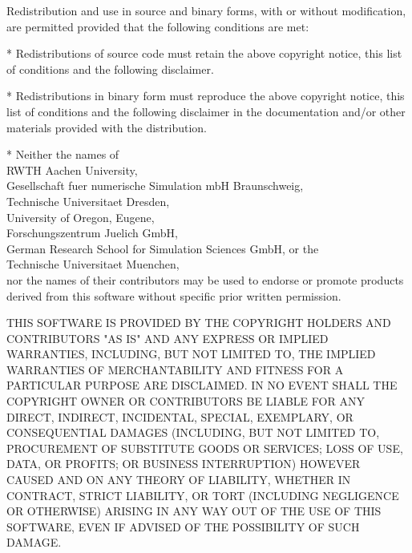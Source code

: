 {\small
Redistribution and use in source and binary forms, with or without
modification, are permitted provided that the following conditions are
met:

* Redistributions of source code must retain the above copyright
  notice, this list of conditions and the following disclaimer.

* Redistributions in binary form must reproduce the above copyright
  notice, this list of conditions and the following disclaimer in the
  documentation and/or other materials provided with the distribution.

* Neither the names of \\ \hspace*{10mm}
   RWTH Aachen University, \\ \hspace*{10mm}
   Gesellschaft fuer numerische Simulation mbH Braunschweig, \\ \hspace*{10mm}
   Technische Universitaet Dresden, \\ \hspace*{10mm}
   University of Oregon, Eugene, \\ \hspace*{10mm}
   Forschungszentrum Juelich GmbH, \\ \hspace*{10mm}
   German Research School for Simulation Sciences GmbH, or the \\ \hspace*{10mm}
   Technische Universitaet Muenchen, \\ \hspace*{10mm}
  nor the names of their contributors may be used to endorse or promote
  products derived from this software without specific prior written
  permission.

THIS SOFTWARE IS PROVIDED BY THE COPYRIGHT HOLDERS AND CONTRIBUTORS
"AS IS" AND ANY EXPRESS OR IMPLIED WARRANTIES, INCLUDING, BUT NOT
LIMITED TO, THE IMPLIED WARRANTIES OF MERCHANTABILITY AND FITNESS FOR
A PARTICULAR PURPOSE ARE DISCLAIMED. IN NO EVENT SHALL THE COPYRIGHT
OWNER OR CONTRIBUTORS BE LIABLE FOR ANY DIRECT, INDIRECT, INCIDENTAL,
SPECIAL, EXEMPLARY, OR CONSEQUENTIAL DAMAGES (INCLUDING, BUT NOT
LIMITED TO, PROCUREMENT OF SUBSTITUTE GOODS OR SERVICES; LOSS OF USE,
DATA, OR PROFITS; OR BUSINESS INTERRUPTION) HOWEVER CAUSED AND ON ANY
THEORY OF LIABILITY, WHETHER IN CONTRACT, STRICT LIABILITY, OR TORT
(INCLUDING NEGLIGENCE OR OTHERWISE) ARISING IN ANY WAY OUT OF THE USE
OF THIS SOFTWARE, EVEN IF ADVISED OF THE POSSIBILITY OF SUCH DAMAGE.
}
